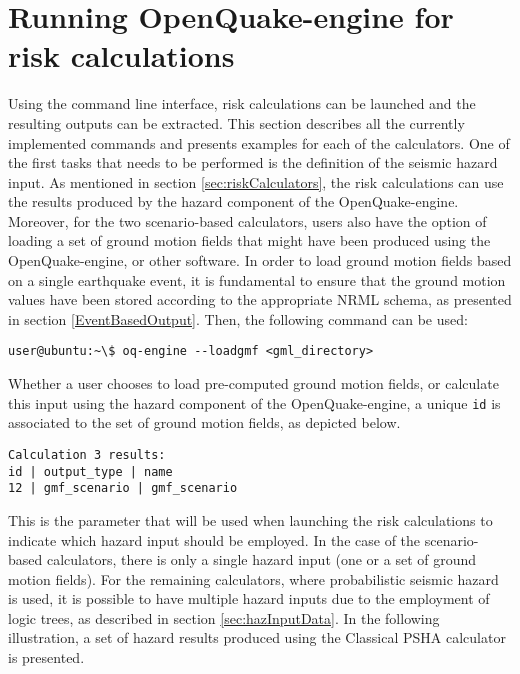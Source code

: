\section{Running OpenQuake-engine for risk calculations}
Using the command line interface, risk calculations can be launched and the resulting outputs can be extracted. This section describes all the currently implemented commands and presents examples for each of the calculators.
One of the first tasks that needs to be performed is the definition of the seismic hazard input. As mentioned in section \ref{sec:riskCalculators}, the risk calculations can use the results produced by the hazard component of the OpenQuake-engine. Moreover, for the two scenario-based calculators, users also have the option of loading a set of ground motion fields that might have been produced using the OpenQuake-engine, or other software.
In order to load ground motion fields based on a single earthquake event, it is fundamental to ensure that the ground motion values have been stored according to the appropriate NRML schema, as presented in section \ref{EventBasedOutput}. Then, the following command can be used:

\begin{Verbatim}[frame=single, commandchars=\\\{\}, samepage=true]
user@ubuntu:~\$ oq-engine --loadgmf <gml_directory>
\end{Verbatim}

Whether a user chooses to load pre-computed ground motion fields, or calculate this input using the hazard component of the OpenQuake-engine, a unique \verb+id+ is associated to the set of ground motion fields, as depicted below.

\begin{Verbatim}[frame=single, commandchars=\\\{\}, samepage=true]
Calculation 3 results:
id | output_type | name
12 | gmf_scenario | gmf_scenario
\end{Verbatim}

This is the parameter that will be used when launching the risk calculations to indicate which hazard input should be employed. In the case of the scenario-based calculators, there is only a single hazard input (one or a set of ground motion fields). For the remaining calculators, where probabilistic seismic hazard is used, it is possible to have multiple hazard inputs due to the employment of logic trees, as described in section \ref{sec:hazInputData}. In the following illustration, a set of hazard results produced using the Classical PSHA calculator is presented.

